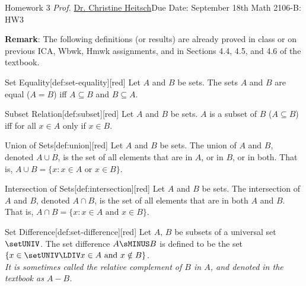 \newpage{}
{Homework 3}
{\textit{Prof.} \href{https://ceheitsch.github.io/webpage/}{Dr. Christine Heitsch}}{Due Date: September 18th}
{Math 2106-B: HW3}
\newpage






\textbf{Remark}: The following definitions (or results) are already proved in class or on previous ICA, 
Wbwk, Hmwk assignments, and in Sections 4.4, 4.5, and 4.6 of the textbook.
\begin{define}{Set Equality}[def:set-equality][red]
  Let $A$ and $B$ be sets. The sets $A$ and $B$ are equal ($A = B$) iff $A \subseteq B$ and $B \subseteq A$.
\end{define}
\begin{define}{Subset Relation}[def:subset][red]
  Let $A$ and $B$ be sets. $A$ is a subset of $B$ ($A \subseteq B$) iff for all $x \in A$ only if $x \in B$.
\end{define}  
\begin{define}{Union of Sets}[def:union][red]
  Let $A$ and $B$ be sets. The union of $A$ and $B$, denoted $A \cup B$, is the 
  set of all elements that are in $A$, or in $B$, or in both. 
  That is, $A \cup B = \{x : x \in A \text{ or } x \in B\}$.
\end{define}
\begin{define}{Intersection of Sets}[def:intersection][red]
  Let $A$ and $B$ be sets. The intersection of $A$ and $B$, denoted $A \cap B$, is the 
  set of all elements that are in both $A$ and $B$. That is, $A \cap B = \{x : x \in A \text{ and } x \in B\}$.
\end{define}
\begin{define}{Set Difference}[def:set-difference][red]
  Let $A$, $B$ be subsets of a universal set $\setUNIV$. The set difference $A \sMINUS B$ is defined to be the set $\{ x \in \setUNIV \LDIV x \in A \text{ and } x \notin B\}$. \vspace*{5px}\\
  \textit{It is sometimes called the relative complement of $B$ in $A$, and denoted in the textbook as $A - B$.}
\end{define}
